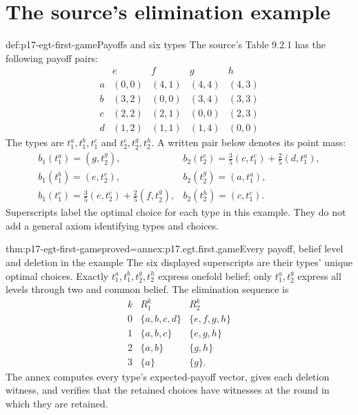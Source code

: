 \section{The source's elimination example}

\begin{hbdefinition}{def:p17-egt-first-game}{Payoffs and six types}
The source's Table 9.2.1 has the following payoff pairs:
\[
\begin{array}{c|rrrr}
 &e&f&g&h\\\hline
a&(0,0)&(4,1)&(4,4)&(4,3)\\
b&(3,2)&(0,0)&(3,4)&(3,3)\\
c&(2,2)&(2,1)&(0,0)&(2,3)\\
d&(1,2)&(1,1)&(1,4)&(0,0)
\end{array}
\]
The types are \(t_1^a,t_1^b,t_1^c\) and \(t_2^e,t_2^g,t_2^h\).
A written pair below denotes its point mass:
\[
\begin{array}{ll}
b_1(t_1^a)=(g,t_2^g),&
b_2(t_2^e)=\tfrac35(c,t_1^c)+\tfrac25(d,t_1^a),\\
b_1(t_1^b)=(e,t_2^e),&
b_2(t_2^g)=(a,t_1^a),\\
b_1(t_1^c)=\tfrac35(e,t_2^e)+\tfrac25(f,t_2^g),&
b_2(t_2^h)=(c,t_1^c).
\end{array}
\]
Superscripts label the optimal choice for each type in this example.
They do not add a general axiom identifying types and choices.
\end{hbdefinition}

\begin{hbtheorem}{thm:p17-egt-first-game}{proved=annex:p17.egt.first.game}{Every payoff, belief level and deletion in the example}
The six displayed superscripts are their types' unique optimal choices.
Exactly \(t_1^a,t_1^b,t_2^g,t_2^h\) express onefold belief;
only \(t_1^a,t_2^g\) express all levels through two and common belief.
The elimination sequence is
\[
 \begin{array}{c|cc}
 k&R_1^k&R_2^k\\\hline
 0&\{a,b,c,d\}&\{e,f,g,h\}\\
 1&\{a,b,c\}&\{e,g,h\}\\
 2&\{a,b\}&\{g,h\}\\
 3&\{a\}&\{g\}.
 \end{array}
\]
The annex computes every type's expected-payoff vector, gives each
deletion witness, and verifies that the retained choices have witnesses
at the round in which they are retained.
\end{hbtheorem}

